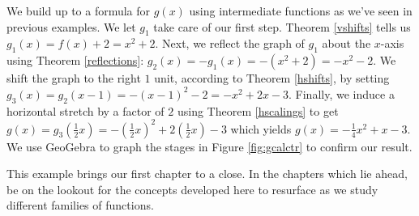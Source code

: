 {
We build up to a formula for $g(x)$ using intermediate functions as we've seen in previous examples.  We let $g_{1}$ take care of our first step.  Theorem \ref{vshifts} tells us $g_{1}(x) = f(x) + 2 = x^2+2$.  Next, we reflect the graph of $g_{1}$ about the $x$-axis using Theorem \ref{reflections}:  $g_{2}(x) = -g_{1}(x) = -\left(x^2+2\right) = -x^2-2$.  We shift the graph to the right $1$ unit, according to Theorem \ref{hshifts}, by setting $g_{3}(x) = g_{2}(x-1) = -(x-1)^2-2 = -x^2+2x-3$.  Finally, we induce a horizontal stretch by a factor of $2$ using Theorem \ref{hscalings} to get $g(x) = g_{3}\left(\frac{1}{2} x\right) = -\left(\frac{1}{2} x\right)^2+2\left(\frac{1}{2} x\right)-3$ which yields $g(x) = -\frac{1}{4} x^2 + x -3$.  We use GeoGebra to graph the stages in Figure \ref{fig:gcalctr} to confirm our result.

}



This example brings our first chapter to a close.  In the chapters which lie ahead, be on the lookout for the concepts developed here to resurface as we study different families of functions.  

